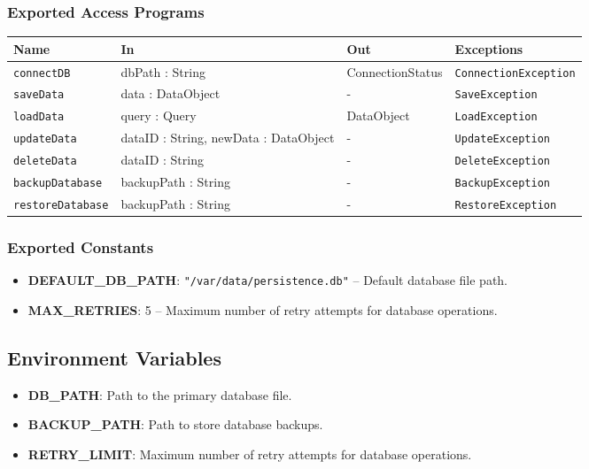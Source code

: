 \documentclass[12pt, titlepage]{article}
\begin{document}
\subsubsection{Exported Access Programs}
\begin{center}
  \renewcommand{\arraystretch}{1.2} %
  \begin{tabularx}{\textwidth}{|l|X|X|X|}
    \hline
    \textbf{Name} & \textbf{In} & \textbf{Out} & \textbf{Exceptions} \\
    \hline 
    \texttt{connectDB} & dbPath : String & ConnectionStatus & \texttt{ConnectionException} \\
    \hline
    \texttt{saveData} & data : DataObject & - & \texttt{SaveException} \\
    \hline
    \texttt{loadData} & query : Query & DataObject & \texttt{LoadException} \\
    \hline
    \texttt{updateData} & dataID : String, newData : DataObject & - & \texttt{UpdateException} \\
    \hline
    \texttt{deleteData} & dataID : String & - & \texttt{DeleteException} \\
    \hline
    \texttt{backupDatabase} & backupPath : String & - & \texttt{BackupException} \\
    \hline
    \texttt{restoreDatabase} & backupPath : String & - & \texttt{RestoreException} \\
    \hline
  \end{tabularx}
\end{center}

\subsubsection{Exported Constants}
\begin{itemize}
    \item \textbf{DEFAULT\_DB\_PATH}: \texttt{"/var/data/persistence.db"} -- Default database file path.
    \item \textbf{MAX\_RETRIES}: 5 -- Maximum number of retry attempts for database operations.
\end{itemize}

\subsection{Environment Variables}
\begin{itemize}
    \item \textbf{DB\_PATH}: Path to the primary database file.
    \item \textbf{BACKUP\_PATH}: Path to store database backups.
    \item \textbf{RETRY\_LIMIT}: Maximum number of retry attempts for database operations.
\end{itemize}
\end{document}
